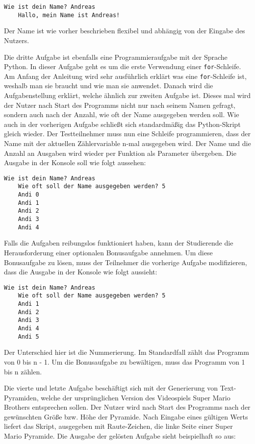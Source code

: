 \begin{lstlisting}[style=Bash]
    Wie ist dein Name? Andreas
    Hallo, mein Name ist Andreas!
\end{lstlisting}

Der Name ist wie vorher beschrieben flexibel und abhängig von der Eingabe des
Nutzers.

Die dritte Aufgabe ist ebenfalls eine Programmieraufgabe mit der
Sprache Python. In dieser Aufgabe geht es um die erste Verwendung einer
\texttt{for}-Schleife. Am Anfang der Anleitung wird sehr ausführlich erklärt was
eine \texttt{for}-Schleife ist, weshalb man sie braucht und wie man sie
anwendet. Danach wird die Aufgabenstellung erklärt, welche ähnlich zur zweiten
Aufgabe ist. Dieses mal wird der Nutzer nach Start des Programms nicht nur nach
seinem Namen gefragt, sondern auch nach der Anzahl, wie oft der Name ausgegeben
werden soll. Wie auch in der vorherigen Aufgabe schließt sich standardmäßig das
Python-Skript gleich wieder. Der Testteilnehmer muss nun eine Schleife
programmieren, dass der Name mit der aktuellen Zählervariable n-mal ausgegeben
wird. Der Name und die Anzahl an Ausgaben wird wieder per Funktion als Parameter
übergeben. Die Ausgabe in der Konsole soll wie folgt aussehen:

\begin{lstlisting}[style=Bash]
    Wie ist dein Name? Andreas
    Wie oft soll der Name ausgegeben werden? 5
    Andi 0
    Andi 1
    Andi 2
    Andi 3
    Andi 4
\end{lstlisting}

Falls die Aufgaben reibungslos funktioniert haben, kann der Studierende
die Herausforderung einer optionalen Bonusaufgabe annehmen. Um diese
Bonusaufgabe zu lösen, muss der Teilnehmer die vorherige Aufgabe modifizieren,
dass die Ausgabe in der Konsole wie folgt aussieht:

\begin{lstlisting}[style=Bash]
    Wie ist dein Name? Andreas
    Wie oft soll der Name ausgegeben werden? 5
    Andi 1
    Andi 2
    Andi 3
    Andi 4
    Andi 5
\end{lstlisting}

Der Unterschied hier ist die Nummerierung. Im Standardfall zählt das Programm
von 0 bis n - 1. Um die Bonusaufgabe zu bewältigen, muss das Programm von 1 bis n
zählen.

Die vierte und letzte Aufgabe beschäftigt sich mit der Generierung von
Text-Pyramiden, welche der ursprünglichen Version des Videospiels Super Mario
Brothers entsprechen sollen. Der Nutzer wird nach Start des Programms nach der gewünschten Größe bzw. Höhe der Pyramide. Nach Eingabe eines gültigen Werts
liefert das Skript, ausgegeben mit Raute-Zeichen, die linke Seite einer Super
Mario Pyramide. Die Ausgabe der gelösten Aufgabe sieht beispielhaft so aus:

